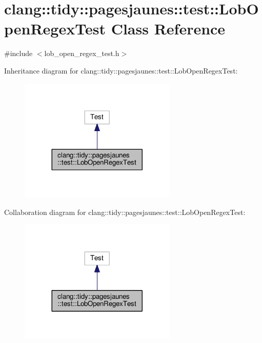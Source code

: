 \hypertarget{classclang_1_1tidy_1_1pagesjaunes_1_1test_1_1_lob_open_regex_test}{}\section{clang\+:\+:tidy\+:\+:pagesjaunes\+:\+:test\+:\+:Lob\+Open\+Regex\+Test Class Reference}
\label{classclang_1_1tidy_1_1pagesjaunes_1_1test_1_1_lob_open_regex_test}


{\ttfamily \#include $<$lob\+\_\+open\+\_\+regex\+\_\+test.\+h$>$}



Inheritance diagram for clang\+:\+:tidy\+:\+:pagesjaunes\+:\+:test\+:\+:Lob\+Open\+Regex\+Test\+:
\nopagebreak
\begin{figure}[H]
\begin{center}
\leavevmode
\includegraphics[width=212pt]{classclang_1_1tidy_1_1pagesjaunes_1_1test_1_1_lob_open_regex_test__inherit__graph}
\end{center}
\end{figure}


Collaboration diagram for clang\+:\+:tidy\+:\+:pagesjaunes\+:\+:test\+:\+:Lob\+Open\+Regex\+Test\+:
\nopagebreak
\begin{figure}[H]
\begin{center}
\leavevmode
\includegraphics[width=212pt]{classclang_1_1tidy_1_1pagesjaunes_1_1test_1_1_lob_open_regex_test__coll__graph}
\end{center}
\end{figure}
